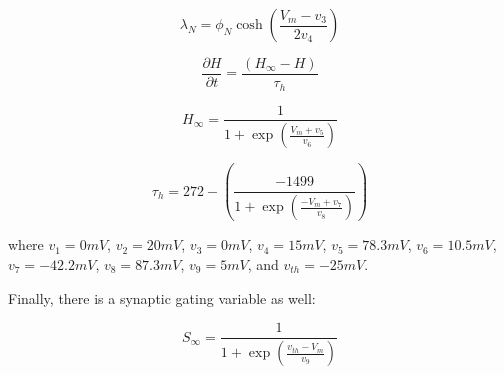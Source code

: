\documentclass[11pt]{article}
\begin{document}
\[ \lambda_N = \phi_N \cosh \left( \frac{V_m - v_3}{2 v_4} \right) \]

\[  \frac{\partial H}{\partial t} = \frac{\left( H_\infty - H \right)}{\tau_h} \]

\[ H_\infty = \frac{1}{1 + \exp \left( \frac{V_m + v_5}{v_6} \right)} \]

\[ \tau_h = 272 - \left( \frac{-1499}{1 + \exp \left( \frac{-V_m + v_7}{v_8} \right)} \right) \]

where $v_1 = 0mV$, $v_2  = 20mV$, $v_3 = 0mV$, $v_4 = 15mV$, $v_5 = 78.3mV$,
$v_6 = 10.5mV$, $v_7 = -42.2mV$, $v_8 = 87.3mV$, $v_9 = 5mV$, and $v_{th} = -25mV$.

Finally, there is a synaptic gating variable as well:

\[ S_\infty = \frac{1}{1 + \exp \left( \frac{v_{th} - V_m}{v_9} \right)} \]



\end{document}
